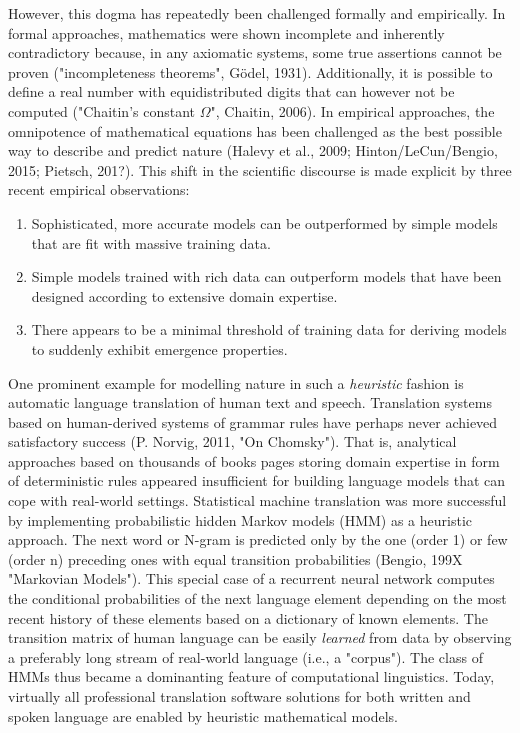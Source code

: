 \documentclass[authoryear,review,3p]{elsarticle}
\begin{document}
However, this dogma has repeatedly been challenged formally
and empirically.
%
In formal approaches,
mathematics were shown incomplete and inherently contradictory because,
in any axiomatic systems, some true assertions cannot be proven
("incompleteness theorems", G\"odel, 1931).
Additionally,
it is possible to define a real number with equidistributed
digits that can however not be computed
("Chaitin's constant $\Omega$", Chaitin, 2006).
%
In empirical approaches,
the omnipotence of mathematical equations has been challenged
as the
best possible way to describe and predict nature
(Halevy et al., 2009; Hinton/LeCun/Bengio, 2015; Pietsch, 201?).
%
This shift in the scientific discourse is made explicit by
three recent empirical observations:
\begin{enumerate}
  \item Sophisticated, more accurate models can be outperformed by
  simple models that are fit with massive training data.
  \item Simple models trained with rich data can outperform
  models that have been designed according to
  extensive domain expertise.
  \item There appears to be a minimal threshold of training data
  for deriving models to suddenly exhibit emergence properties.
\end{enumerate}

One prominent example for modelling nature in such a \textit{heuristic} fashion is
automatic language translation of human text and speech.
Translation systems based on 
human-derived systems of grammar rules have perhaps never achieved
satisfactory success (P. Norvig, 2011, "On Chomsky").
That is, analytical approaches based on
thousands of books pages storing domain expertise in form of
deterministic rules appeared insufficient for building
language models that can cope with real-world settings.
%
Statistical machine translation was more successful
by implementing probabilistic hidden Markov models (HMM)
as a heuristic approach.
%
The next word or N-gram is predicted
only by the one (order 1) or few (order n) preceding ones
with equal transition probabilities (Bengio, 199X "Markovian Models").
This special case of a recurrent neural network
computes the conditional probabilities of the next language element
depending on the most recent history of these elements
based on a dictionary of known elements.
The transition matrix of human language can be easily \textit{learned}
from data by observing a preferably long stream of
real-world language (i.e., a "corpus").
%
The class of HMMs
thus became a dominanting feature
of computational linguistics.
%
Today, virtually all professional translation software solutions
for both written and spoken language
are enabled by heuristic mathematical models.
\end{document}

